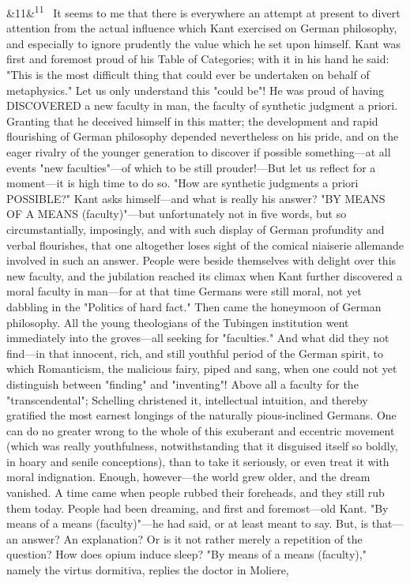 \documentclass[12pt]{article}
\newcommand{\para}[1][]{\par\noindent\ifx&#1&\else\textsuperscript{\footnotesize #1}~\fi}
\begin{document}
\para[11] It seems to me that there is everywhere an attempt at present to divert attention from the actual influence which Kant exercised on German philosophy, and especially to ignore prudently the value which he set upon himself. Kant was first and foremost proud of his Table of Categories; with it in his hand he said: "This is the most difficult thing that could ever be undertaken on behalf of metaphysics." Let us only understand this "could be"! He was proud of having DISCOVERED a new faculty in man, the faculty of synthetic judgment a priori. Granting that he deceived himself in this matter; the development and rapid flourishing of German philosophy depended nevertheless on his pride, and on the eager rivalry of the younger generation to discover if possible something---at all events "new faculties"---of which to be still prouder!---But let us reflect for a moment---it is high time to do so. "How are synthetic judgments a priori POSSIBLE?" Kant asks himself---and what is really his answer? "BY MEANS OF A MEANS (faculty)"---but unfortunately not in five words, but so circumstantially, imposingly, and with such display of German profundity and verbal flourishes, that one altogether loses sight of the comical niaiserie allemande involved in such an answer. People were beside themselves with delight over this new faculty, and the jubilation reached its climax when Kant further discovered a moral faculty in man---for at that time Germans were still moral, not yet dabbling in the "Politics of hard fact." Then came the honeymoon of German philosophy. All the young theologians of the Tubingen institution went immediately into the groves---all seeking for "faculties." And what did they not find---in that innocent, rich, and still youthful period of the German spirit, to which Romanticism, the malicious fairy, piped and sang, when one could not yet distinguish between "finding" and "inventing"! Above all a faculty for the "transcendental"; Schelling christened it, intellectual intuition, and thereby gratified the most earnest longings of the naturally pious-inclined Germans. One can do no greater wrong to the whole of this exuberant and eccentric movement (which was really youthfulness, notwithstanding that it disguised itself so boldly, in hoary and senile conceptions), than to take it seriously, or even treat it with moral indignation. Enough, however---the world grew older, and the dream vanished. A time came when people rubbed their foreheads, and they still rub them today. People had been dreaming, and first and foremost---old Kant. "By means of a means (faculty)"---he had said, or at least meant to say. But, is that---an answer? An explanation? Or is it not rather merely a repetition of the question? How does opium induce sleep? "By means of a means (faculty)," namely the virtus dormitiva, replies the doctor in Moliere,
\end{document}
